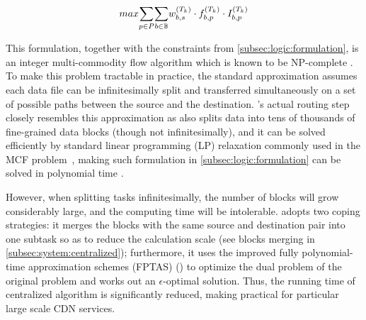 \begin{equation}
\centering
max \displaystyle{\sum_{p\in P}} \displaystyle{\sum_{b\in \mathbb{B}}} w^{(T_k)}_{b,s} \cdot f_{b,p}^{(T_k)} \cdot I_{b,p}^{(T_k)}
\end{equation}

This formulation, together with the constraints from \Section\ref{subsec:logic:formulation}, is an integer multi-commodity flow algorithm which is known to be NP-complete \cite{garg1997primal}.
To make this problem tractable in practice,
the standard approximation assumes each data file can be infinitesimally split and transferred simultaneously on a set of possible paths between the source and the destination.
\name's actual routing step closely resembles this approximation as \name also splits data into tens of thousands of fine-grained data blocks (though not infinitesimally), and it can be solved efficiently by standard linear programming (LP) relaxation commonly used in the MCF problem~\cite{garg2007faster},
making such formulation in \Section\ref{subsec:logic:formulation} can be solved in polynomial time \cite{reed2012traffic}.

However, when splitting tasks infinitesimally, the number of blocks will grow considerably large, and the computing time will be intolerable. \name adopts two coping strategies: it merges the blocks with the same source and destination pair into one subtask so as to reduce the calculation scale (see blocks merging in \Section\ref{subsec:system:centralized}); furthermore, it uses the improved fully polynomial-time approximation schemes (FPTAS) (\cite{fleischer2000approximating}) to optimize the dual problem of the original problem and works out an $\epsilon$-optimal solution. Thus, the running time of centralized algorithm is significantly reduced, making \name practical for particular large scale CDN services.
